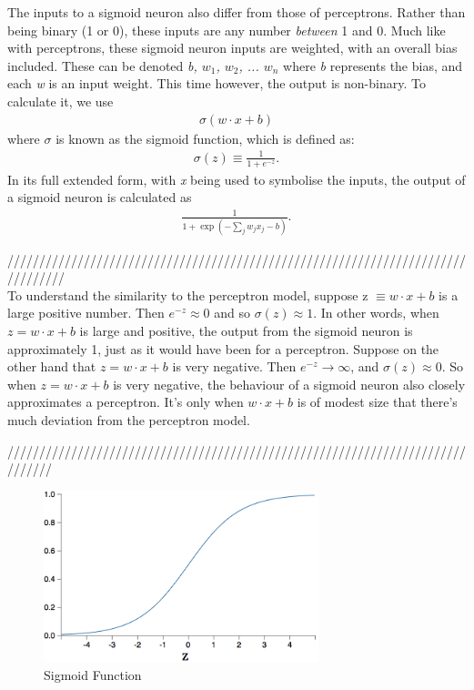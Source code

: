 \documentclass[12pt,a4paper]{article}
\begin{document}
The inputs to a sigmoid neuron also differ from those of perceptrons. Rather than being binary (1 or 0), these inputs are any number \textit{between} 1 and 0. %
Much like with perceptrons, these sigmoid neuron inputs are weighted, with an overall bias included. These can be denoted \textit{b, $w_1$, $w_2$, ... $w_n$}
where \textit{b} represents the bias, and each \textit{w} is an input weight. This time however, the output is non-binary. To calculate it, we use 
\begin{eqnarray}
\sigma (w \cdot x+b)
\end{eqnarray}
where $\sigma$ is known as the sigmoid function, which is defined as:
\begin{eqnarray} 
\sigma(z) \equiv \frac{1}{1+e^{-z}}.
\end{eqnarray}
In its full extended form, with \textit{x} being used to symbolise the inputs, the output of a sigmoid neuron is calculated as
\begin{eqnarray} 
\frac{1}{1+\exp(-\sum_j w_j x_j-b)}.
\end{eqnarray}

/////////////////////////////////////////////////////////////////////////////////\\
To understand the similarity to the perceptron model, suppose 
z $\equiv w \cdot x + b$ is a large positive number. Then 
$e^{-z} \approx 0$ and so $\sigma(z) \approx 1$. In other words, when $z = w \cdot x+b$ is large and positive, the output from the sigmoid neuron is approximately 1, just as it would have been for a perceptron. Suppose on the other hand that $z = w \cdot x+b$ is very negative. Then $e^{-z} \rightarrow \infty$, and $\sigma(z) \approx 0$. So when 
$z = w \cdot x +b$ is very negative, the behaviour of a sigmoid neuron also closely approximates a perceptron. It's only when 
$w \cdot x+b$ is of modest size that there's much deviation from the perceptron model\citep{NeuralNetworksAndDeepLearning}.

///////////////////////////////////////////////////////////////////////////////

\begin{figure}[h]
	\includegraphics[width=\textwidth, height=5cm]{SigmoidFunction.png}
	\caption{Sigmoid Function} 
	
\end{figure}
\end{document}
